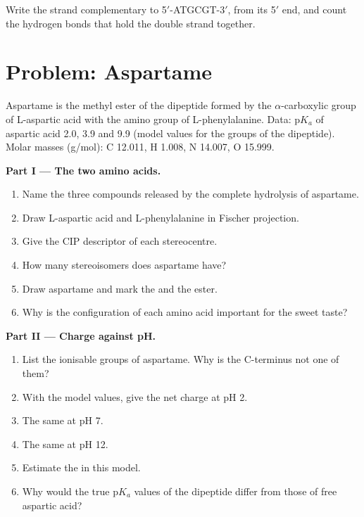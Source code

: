 \begin{exercise}[$\star\star\star$]\label{exo:b2:biomolecules:12}
Write the strand complementary to 5$'$-ATGCGT-3$'$, from its 5$'$ end, and count the hydrogen bonds
that hold the double strand together.
\end{exercise}

\section{Problem: Aspartame}

\begin{problem}
\label{pb:b2:biomolecules:1}
Aspartame is the methyl ester of the dipeptide formed by the $\alpha$-carboxylic group of L-aspartic acid
with the amino group of L-phenylalanine. Data: $\mathrm pK_a$ of aspartic acid 2.0, 3.9 and 9.9 (model
values for the groups of the dipeptide). Molar masses (\unit{g/mol}): C 12.011, H 1.008, N 14.007,
O 15.999.

\medskip
\noindent\textbf{Part I --- The two amino acids.}
\begin{enumerate}
  \item Name the three compounds released by the complete hydrolysis of aspartame.
  \item Draw L-aspartic acid and L-phenylalanine in Fischer projection.
  \item Give the CIP descriptor of each stereocentre.
  \item How many stereoisomers does aspartame have?
  \item Draw aspartame and mark the  and the ester.
  \item Why is the configuration of each amino acid important for the sweet taste?
\end{enumerate}

\medskip
\noindent\textbf{Part II --- Charge against pH.}
\begin{enumerate}[resume]
  \item List the ionisable groups of aspartame. Why is the C-terminus not one of them?
  \item With the model values, give the net charge at pH 2.
  \item The same at pH 7.
  \item The same at pH 12.
  \item Estimate the  in this model.
  \item Why would the true $\mathrm pK_a$ values of the dipeptide differ from those of free aspartic
        acid?
\end{enumerate}


\end{problem}
